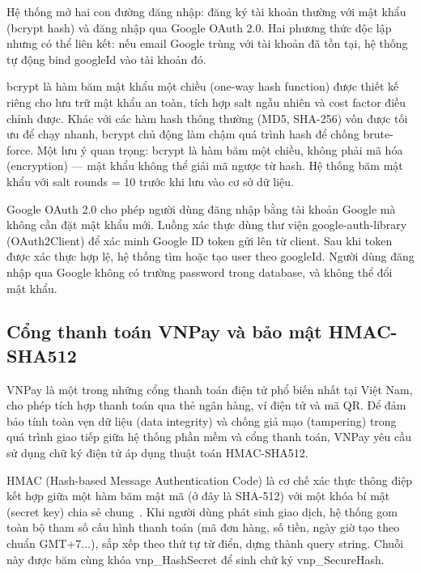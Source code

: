 Hệ thống mở hai con đường đăng nhập: đăng ký tài khoản thường với mật khẩu (bcrypt hash) và đăng nhập qua Google OAuth 2.0. Hai phương thức độc lập nhưng có thể liên kết: nếu email Google trùng với tài khoản đã tồn tại, hệ thống tự động bind googleId vào tài khoản đó.

bcrypt là hàm băm mật khẩu một chiều (one-way hash function) được thiết kế riêng cho lưu trữ mật khẩu an toàn, tích hợp salt ngẫu nhiên và cost factor điều chỉnh được. Khác với các hàm hash thông thường (MD5, SHA-256) vốn được tối ưu để chạy nhanh, bcrypt chủ động làm chậm quá trình hash để chống brute-force. Một lưu ý quan trọng: bcrypt là hàm băm một chiều, không phải mã hóa (encryption) --- mật khẩu không thể giải mã ngược từ hash. Hệ thống băm mật khẩu với salt rounds = 10 trước khi lưu vào cơ sở dữ liệu.

Google OAuth 2.0 cho phép người dùng đăng nhập bằng tài khoản Google mà không cần đặt mật khẩu mới. Luồng xác thực dùng thư viện google-auth-library (OAuth2Client) để xác minh Google ID token gửi lên từ client. Sau khi token được xác thực hợp lệ, hệ thống tìm hoặc tạo user theo googleId. Người dùng đăng nhập qua Google không có trường password trong database, và không thể đổi mật khẩu.

\subsection{Cổng thanh toán VNPay và bảo mật HMAC-SHA512}

VNPay là một trong những cổng thanh toán điện tử phổ biến nhất tại Việt Nam, cho phép tích hợp thanh toán qua thẻ ngân hàng, ví điện tử và mã QR. Để đảm bảo tính toàn vẹn dữ liệu (data integrity) và chống giả mạo (tampering) trong quá trình giao tiếp giữa hệ thống phần mềm và cổng thanh toán, VNPay yêu cầu sử dụng chữ ký điện tử áp dụng thuật toán HMAC-SHA512.

HMAC (Hash-based Message Authentication Code) là cơ chế xác thực thông điệp kết hợp giữa một hàm băm mật mã (ở đây là SHA-512) với một khóa bí mật (secret key) chia sẻ chung~\cite{rfc2104}. Khi người dùng phát sinh giao dịch, hệ thống gom toàn bộ tham số cấu hình thanh toán (mã đơn hàng, số tiền, ngày giờ tạo theo chuẩn GMT+7...), sắp xếp theo thứ tự từ điển, dựng thành query string. Chuỗi này được băm cùng khóa vnp\_HashSecret để sinh chữ ký vnp\_SecureHash.

